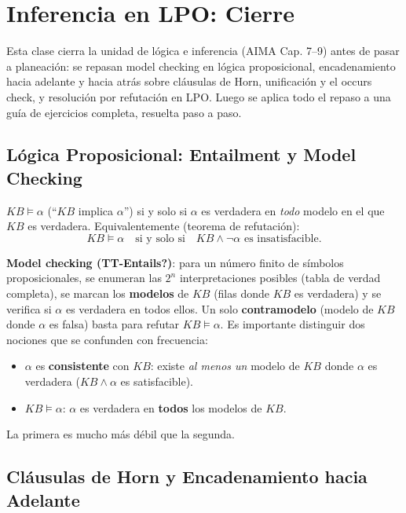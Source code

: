 \section{Inferencia en LPO: Cierre}

Esta clase cierra la unidad de lógica e inferencia (AIMA Cap. 7--9) antes de pasar a planeación: se
repasan model checking en lógica proposicional, encadenamiento hacia adelante y hacia atrás sobre
cláusulas de Horn, unificación y el occurs check, y resolución por refutación en LPO. Luego se aplica
todo el repaso a una guía de ejercicios completa, resuelta paso a paso.

\subsection{Lógica Proposicional: Entailment y Model Checking}

\begin{definition}
$KB \models \alpha$ (``$KB$ implica $\alpha$'') si y solo si $\alpha$ es verdadera en \emph{todo}
modelo en el que $KB$ es verdadera. Equivalentemente (teorema de refutación):
\[
    KB \models \alpha \quad \text{si y solo si} \quad KB \land \neg\alpha \text{ es insatisfacible.}
\]
\end{definition}

\textbf{Model checking (TT-Entails?)}: para un número finito de símbolos proposicionales, se
enumeran las $2^n$ interpretaciones posibles (tabla de verdad completa), se marcan los
\textbf{modelos} de $KB$ (filas donde $KB$ es verdadera) y se verifica si $\alpha$ es verdadera en
todos ellos. Un solo \textbf{contramodelo} (modelo de $KB$ donde $\alpha$ es falsa) basta para
refutar $KB \models \alpha$. Es importante distinguir dos nociones que se confunden con frecuencia:
\begin{itemize}
    \item $\alpha$ es \textbf{consistente} con $KB$: existe \emph{al menos un} modelo de $KB$ donde
    $\alpha$ es verdadera ($KB \land \alpha$ es satisfacible).
    \item $KB \models \alpha$: $\alpha$ es verdadera en \textbf{todos} los modelos de $KB$.
\end{itemize}
La primera es mucho más débil que la segunda.

\subsection{Cláusulas de Horn y Encadenamiento hacia Adelante}


